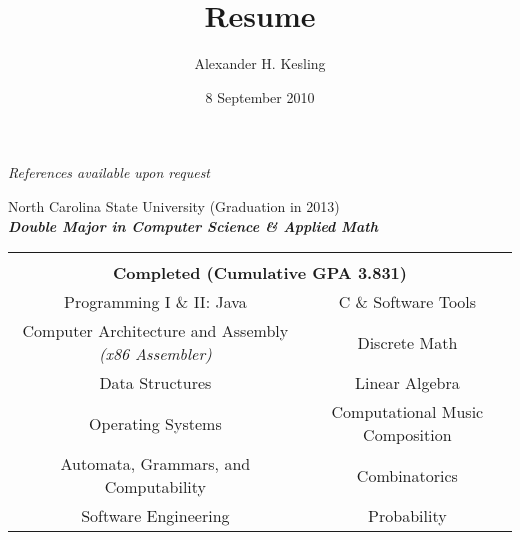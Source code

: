\documentclass[11pt]{article}
\title{Resume}
\author{Alexander H. Kesling}
\date{8 September 2010}
\begin{document}
    \newenvironment{itemz}[1][\labelitemi]{
        \begin{list}{#1}{\leftmargin=0.9em}
            \setlength{\itemsep}{0pt}
            \setlength{\parskip}{0pt}
            \setlength{\parsep}{0pt}
            \setlength{\parindent}{0.2cm}
        }{
            \end{list}
        }
    \emph{\scriptsize References available upon request}
    \fancyhf{}
    \footnotesize
        \begin{itemz}
            \setlength{\itemsep}{0pt}
            \setlength{\parskip}{0pt}
            \setlength{\parsep}{0pt}
            \item North Carolina State University (Graduation in 2013) \\ {\bf \scriptsize \emph{Double Major in Computer Science \& Applied Math}}            \\
                \begin{tabular}{ c c }
                    \multicolumn{2}{c}{}\\
                    \multicolumn{2}{c}{\bf Completed (Cumulative GPA 3.831)
                    \vspace{0.2em}} \\
                    Programming I \& II: Java   & C \& Software Tools \\
                    Computer Architecture and Assembly \emph{(x86 Assembler)} & Discrete Math \\
                    Data Structures             & Linear Algebra \\
                    Operating Systems           & Computational Music Composition \\
                    Automata, Grammars, and Computability & Combinatorics \\ 
                    Software Engineering        & Probability\\
                \end{tabular}
        \end{itemz}
\end{document}
